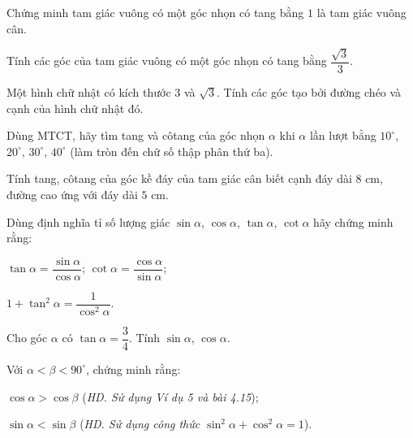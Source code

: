 \begin{practice}
\begin{questions}[series=SBT]
        \item Chứng minh tam giác vuông có một góc nhọn có tang bằng $1$ là tam giác vuông cân.

        \answerline
        \answerline

        \item
        \begin{questions}
            \item Tính các góc của tam giác vuông có một góc nhọn có tang bằng $\dfrac{\sqrt3}{3}$.

            \answerline

            \item Một hình chữ nhật có kích thước $3$ và $\sqrt3$. Tính các góc tạo bởi đường chéo và cạnh của hình chữ nhật đó.

            \answerline
        \end{questions}

        \item Dùng MTCT, hãy tìm tang và côtang của góc nhọn $\alpha$ khi $\alpha$ lần lượt bằng $10^\circ$, $20^\circ$, $30^\circ$, $40^\circ$ (làm tròn đến chữ số thập phân thứ ba).

        \answerline

        \item Tính tang, côtang của góc kề đáy của tam giác cân biết cạnh đáy dài $8$ cm, đường cao ứng với đáy dài $5$ cm.

        \answerline
        \answerline

        \item Dùng định nghĩa tỉ số lượng giác $\sin\alpha$, $\cos\alpha$, $\tan\alpha$, $\cot\alpha$ hãy chứng minh rằng:
        \begin{questions}
            \item $\tan\alpha=\dfrac{\sin\alpha}{\cos\alpha}$; $\cot\alpha=\dfrac{\cos\alpha}{\sin\alpha}$;
            \item $1+\tan^2\alpha=\dfrac{1}{\cos^2\alpha}$.
        \end{questions}

        \answerline
        \answerline

        \item Cho góc $\alpha$ có $\tan\alpha=\dfrac{3}{4}$. Tính $\sin\alpha$, $\cos\alpha$.

        \answerline

        \item Với $\alpha<\beta<90^\circ$, chứng minh rằng:
        \begin{questions}
            \item $\cos\alpha>\cos\beta$ (\textit{HD. Sử dụng Ví dụ 5 và bài 4.15});
            \item $\sin\alpha<\sin\beta$ (\textit{HD. Sử dụng công thức $\sin^2\alpha+\cos^2\alpha=1$}).
        \end{questions}

        \answerline
        \answerline
    \end{questions}
\end{practice}
